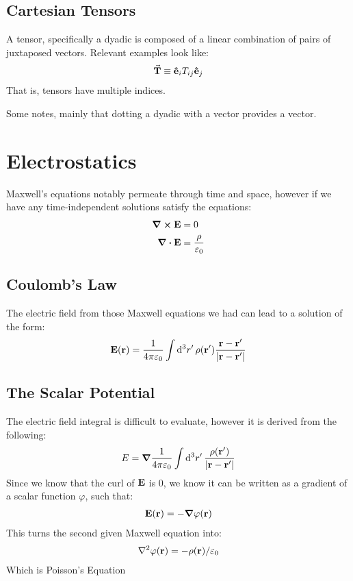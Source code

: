 \documentclass[12pt]{article}
\theoremstyle{plain}
\theoremstyle{definition}
\newcommand{\veps}{\varepsilon}
\newcommand{\vphi}{\varphi}
\begin{document}
\subsection{Cartesian Tensors}
A tensor, specifically a dyadic is composed of a linear combination of pairs of juxtaposed vectors. Relevant examples look like:
\begin{align*}
  \va{\vb{T}}\equiv\vu{e}_iT_{ij}\vu{e}_j
\end{align*}
That is, tensors have multiple indices.

Some notes, mainly that dotting a dyadic with a vector provides a vector. 
\section{Electrostatics}
Maxwell's equations notably permeate through time and space, however if we have any time-independent solutions satisfy the equations:
\begin{align*}
  \curl{\vb{E}}&=0\\
  \div{\vb{E}}&=\frac{\rho}{\veps_0}
\end{align*}
\subsection{Coulomb's Law}
The electric field from those Maxwell equations we had can lead to a solution of the form:
\begin{align*}
  \vb{E(r)}=\frac1{4\pi\veps_0}\int\dd[3]{r'}\rho(\vb{r}')
  \frac{\vb{r-r}'}{\abs{\vb{r-r}'}}
\end{align*}
\subsection{The Scalar Potential}
The electric field integral is difficult to evaluate, however it is derived from the following:
\begin{align*}
  E=\grad{\frac1{4\pi\veps_0}}\int\dd[3]{r'}
  \frac{\rho(\vb{r}')}{\abs{\vb{r-r}'}}
\end{align*}
Since we know that the curl of $\vb{E}$ is $0$, we know it can be written as a gradient of a scalar function $\vphi$, such that:
\begin{align*}
  \vb{E(r)}=-\grad{\vphi(\vb{r})}
\end{align*}
This turns the second given Maxwell equation into:
\begin{align*}
  \laplacian{\vphi(\vb{r})}=-\rho(\vb{r})/\veps_0
\end{align*}
Which is Poisson's Equation
\end{document}
